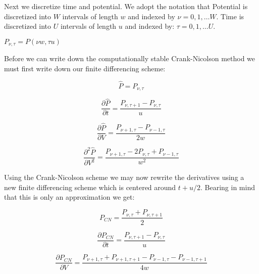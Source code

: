 \documentclass[10pt]{article}
\begin{document}
Next we discretize time and potential. We adopt the notation that
Potential is discretized into $W$ intervals of length $w$ and indexed
by $\nu= 0,1, \dots W $.  Time is discretized  into $U$ intervals of
length $u$ and indexed by: $\tau= 0,1, \dots U $.



$P_{\nu,\tau} = P(\nu w,\tau u)$

Before we can write down the computationally stable Crank-Nicolson
method we must first write down our finite differencing scheme:

\begin{equation}
    \hat{P} = P_{\nu,\tau}
\end{equation}

\begin{equation}
    \frac{\partial \hat{P}}{\partial t} = \frac{P_{\nu,\tau +1 } -
    P_{\nu,\tau}}{u}
\end{equation}

\begin{equation}
    \frac{\partial \hat{P}}{\partial V} = 
    \frac{P_{\nu +1,\tau } -
    P_{\nu - 1,\tau } }
    {2w}
\end{equation}

\begin{equation}
    \frac{\partial^2 \hat{P}}{\partial V^2} = 
    \frac{P_{\nu+1,\tau} - 2 P_{\nu,\tau} + P_{\nu-1,\tau}}
    {w^2}
\end{equation}


Using the Crank-Nicolson scheme we  may now rewrite the derivatives
using a new finite differencing scheme which is centered around $t +
u/2$. Bearing in mind that this is only
an approximation we get:


\begin{equation}
    P_{CN} = \frac{P_{\nu,\tau} + P_{\nu,\tau + 1}}{2}
\end{equation}

\begin{equation}
    \frac{\partial P_{CN}}{\partial t} = \frac{P_{\nu,\tau +1 } -
    P_{\nu,\tau}}{u}
\end{equation}

\begin{equation}
    \frac{\partial P_{CN}}{\partial V} = 
    \frac{P_{\nu +1,\tau } + P_{\nu +1,\tau +1 } -
    P_{\nu - 1,\tau } - P_{\nu -1,\tau +1}} 
    {4w}
\end{equation}
\end{document}
